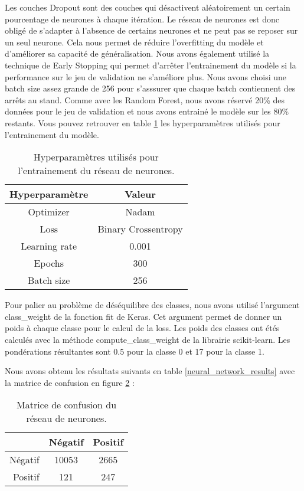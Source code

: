 Les couches Dropout sont des couches qui désactivent aléatoirement un certain pourcentage de neurones à chaque itération.
Le réseau de neurones est donc obligé de s'adapter à l'absence de certains neurones et ne peut pas se reposer sur un seul neurone.
Cela nous permet de réduire l'overfitting du modèle et d'améliorer sa capacité de généralisation.
Nous avons également utilisé la technique de Early Stopping qui permet d'arrêter l'entrainement du modèle si la performance sur le jeu de validation ne s'améliore plus.
Nous avons choisi une batch size assez grande de 256 pour s'asssurer que chaque batch contiennent des arrêts au stand.
Comme avec les Random Forest, nous avons réservé 20\% des données pour le jeu de validation et nous avons entrainé le modèle sur les 80\% restants.
Vous pouvez retrouver en table \ref{neural_network_hyperparameters} les hyperparamètres utilisés pour l'entrainement du modèle.
\begin{table}[H]
    \begin{center}
        \begin{tabular}{|c|c|}
            Hyperparamètre & Valeur              \\
            \hline
            Optimizer      & Nadam               \\
            Loss           & Binary Crossentropy \\
            Learning rate  & 0.001               \\
            Epochs         & 300                 \\
            Batch size     & 256                 \\
        \end{tabular}
    \end{center}
    \caption{Hyperparamètres utilisés pour l'entrainement du réseau de neurones.}
    \label{neural_network_hyperparameters}
\end{table}
Pour palier au problème de déséquilibre des classes, nous avons utilisé l'argument class\_weight de la fonction fit de Keras.
Cet argument permet de donner un poids à chaque classe pour le calcul de la loss. Les poids des classes ont étés calculés avec la méthode compute\_class\_weight \cite{classweight}
de la librairie scikit-learn. Les pondérations résultantes sont 0.5 pour la classe 0 et 17 pour la classe 1.

Nous avons obtenu les résultats suivants en table \ref{neural_network_results} avec la matrice de confusion en figure \ref{neural_network_confusion_matrix} :
\begin{table}[H]
    \begin{center}
        \caption{\label{neural_network_confusion_matrix}Matrice de confusion du réseau de neurones.}
        \begin{tabular}{r|cc}
                    & Négatif & Positif \\ \hline
            Négatif & 10053   & 2665    \\
            Positif & 121     & 247     \\
        \end{tabular}
    \end{center}
\end{table}

